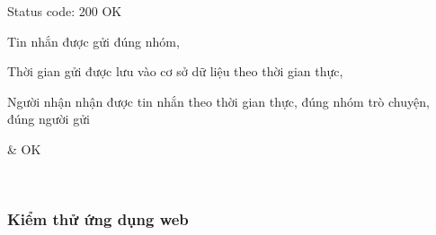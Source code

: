 \begin{enumerate}
\begin{xltabular}{\textwidth}
		      Status code: 200 OK

		      Tin nhắn được gửi đúng nhóm,

		      Thời gian gửi được lưu vào cơ sở dữ liệu theo thời gian thực,

		      Người nhận nhận được tin nhắn theo thời gian thực, đúng nhóm trò chuyện, đúng người gửi

		      & OK

		      \\ \hline

	      \end{xltabular}
\end{enumerate}

\subsubsection{Kiểm thử ứng dụng web}
